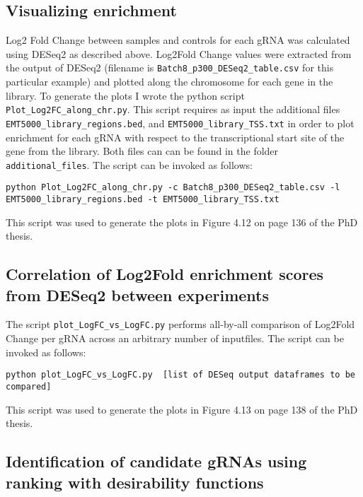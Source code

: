 \subsection{Visualizing enrichment}
Log2 Fold Change between samples and controls for each gRNA was calculated using DESeq2 as described above. Log2Fold Change values were extracted from the output of DESeq2 (filename is \verb|Batch8_p300_DESeq2_table.csv| for this particular example) and plotted along the chromosome for each gene in the library. To generate the plots I wrote the python script \verb|Plot_Log2FC_along_chr.py|. This script requires as input the additional files \verb|EMT5000_library_regions.bed|, and \verb|EMT5000_library_TSS.txt| in order to plot enrichment for each gRNA with respect to the transcriptional start site of the gene from the library. Both files can can be found in the folder \verb|additional_files|. The script can be invoked as follows:

\begin{small}\begin{lstlisting}
python Plot_Log2FC_along_chr.py -c Batch8_p300_DESeq2_table.csv -l EMT5000_library_regions.bed -t EMT5000_library_TSS.txt
\end{lstlisting}\end{small}

This script was used to generate the plots in Figure 4.12 on page 136 of the PhD thesis.

\subsection{Correlation of Log2Fold enrichment scores from DESeq2 between experiments}

The script \verb|plot_LogFC_vs_LogFC.py| performs all-by-all comparison of Log2Fold Change per gRNA across an arbitrary number of inputfiles. The script can be invoked as follows:

\begin{small}\begin{lstlisting}
python plot_LogFC_vs_LogFC.py  [list of DESeq output dataframes to be compared]
\end{lstlisting}\end{small}

This script was used to generate the plots in Figure 4.13 on page 138 of the PhD thesis.

\subsection{Identification of candidate gRNAs using ranking with desirability functions}

